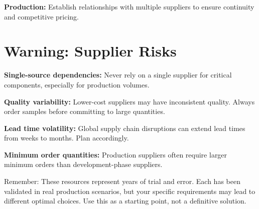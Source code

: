 \textbf{Production:}
Establish relationships with multiple suppliers to ensure continuity and competitive pricing.

\section{Warning: Supplier Risks}

\begin{tcolorbox}[colback=red!10,colframe=red!75!black,title=Critical Supplier Considerations]
\textbf{Single-source dependencies:} Never rely on a single supplier for critical components, especially for production volumes.

\textbf{Quality variability:} Lower-cost suppliers may have inconsistent quality. Always order samples before committing to large quantities.

\textbf{Lead time volatility:} Global supply chain disruptions can extend lead times from weeks to months. Plan accordingly.

\textbf{Minimum order quantities:} Production suppliers often require larger minimum orders than development-phase suppliers.
\end{tcolorbox}

Remember: These resources represent years of trial and error. Each has been validated in real production scenarios, but your specific requirements may lead to different optimal choices. Use this as a starting point, not a definitive solution.